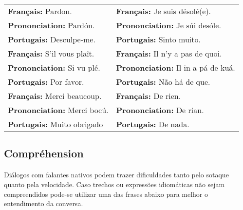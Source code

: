 \documentclass{article}
\begin{document}
        \begin{center}
            \begin{tabular}{m{8cm} m{8cm}}
                \textbf{Français:}      Pardon.      & \textbf{Français:} Je suis désolé(e).\\
                \textbf{Prononciation:} Pardón.      & \textbf{Prononciation:} Je súi desóle.\\
                \textbf{Portugais:}     Desculpe-me. & \textbf{Portugais:} Sinto muito.\\[2.5ex] 

                \textbf{Français:}      S’il vous plaît. & \textbf{Français:}      Il n’y a pas de quoi.\\
                \textbf{Prononciation:} Si vu plé.       & \textbf{Prononciation:} Il in a pá de kuá.\\
                \textbf{Portugais:}     Por favor.       & \textbf{Portugais:}     Não há de que.\\[2.5ex]

                \textbf{Français:}      Merci beaucoup. & \textbf{Français:}      De rien.\\
                \textbf{Prononciation:} Merci bocú.     & \textbf{Prononciation:} De rian.\\
                \textbf{Portugais:}     Muito obrigado  & \textbf{Portugais:}     De nada.\\
            \end{tabular}
        \end{center}
    
    \subsection{Compréhension}
        \paragraph{}Diálogos com falantes nativos podem trazer dificuldades tanto pelo sotaque quanto pela velocidade. Caso trechos ou expressões idiomáticas não sejam compreendidos pode-se utilizar uma das frases abaixo para melhor o entendimento da conversa.
\end{document}
